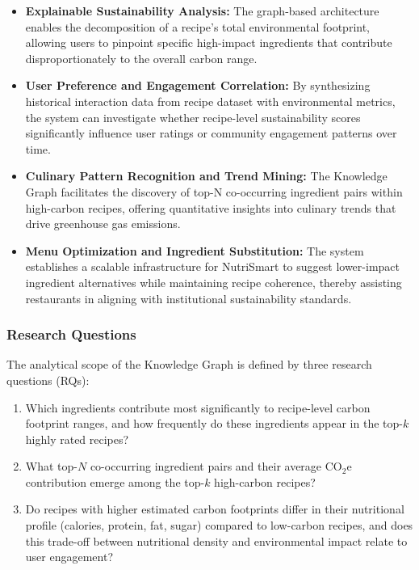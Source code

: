 \documentclass{article}
\newcommand{\question}[1]{#1}
\begin{document}
\begin{itemize}
    \item \textbf{Explainable Sustainability Analysis:} The graph-based architecture enables the decomposition of a recipe's total environmental footprint, allowing users to pinpoint specific high-impact ingredients that contribute disproportionately to the overall carbon range.
    \item \textbf{User Preference and Engagement Correlation:} By synthesizing historical interaction data from recipe dataset with environmental metrics, the system can investigate whether recipe-level sustainability scores significantly influence user ratings or community engagement patterns over time.
    \item \textbf{Culinary Pattern Recognition and Trend Mining:} The Knowledge Graph facilitates the discovery of top-N co-occurring ingredient pairs within high-carbon recipes, offering quantitative insights into culinary trends that drive greenhouse gas emissions.
    \item \textbf{Menu Optimization and Ingredient Substitution:} The system establishes a scalable infrastructure for NutriSmart to suggest lower-impact ingredient alternatives while maintaining recipe coherence, thereby assisting restaurants in aligning with institutional sustainability standards.
\end{itemize}


\question{\subsubsection*{Research Questions}}

The analytical scope of the Knowledge Graph is defined by three research questions (RQs):

\begin{enumerate}
    \item[\textbf{RQ1}] Which ingredients contribute most significantly to recipe-level carbon footprint ranges, and how frequently do these ingredients appear in the top-$k$ highly rated recipes?
    \item[\textbf{RQ2}] What top-$N$ co-occurring ingredient pairs and their average CO$_2$e contribution emerge among the top-$k$ high-carbon recipes?
    \item[\textbf{RQ3}] Do recipes with higher estimated carbon footprints differ in their nutritional profile (calories, protein, fat, sugar) compared to low-carbon recipes, and does this trade-off between nutritional density and environmental impact relate to user engagement?
\end{enumerate}
\end{document}
